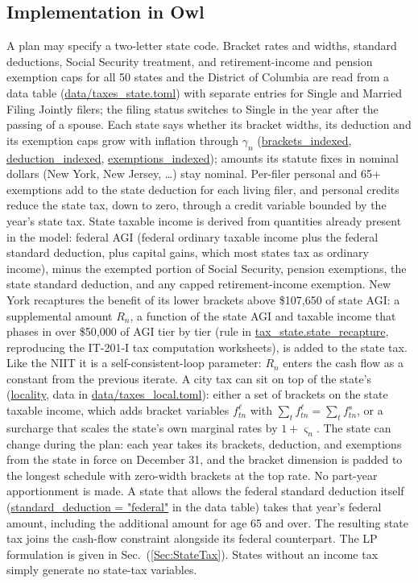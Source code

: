 \documentclass[fleqn,12pt]{report}
\newcommand{\code}[1]{\url{#1}}
\begin{document}
\subsection*{Implementation in Owl}
A plan may specify a two-letter state code.
Bracket rates and widths, standard deductions, Social Security treatment, and
retirement-income and pension exemption caps for all 50 states and the District
of Columbia are read from a data table (\code{data/taxes_state.toml}) with
separate entries for Single and Married Filing Jointly filers; the filing
status switches to Single in the year after the passing of a spouse. Each state says whether its
bracket widths, its deduction and its exemption caps grow with inflation through
$\gamma_n$ (\code{brackets_indexed}, \code{deduction_indexed},
\code{exemptions_indexed}); amounts its statute fixes in nominal dollars (New
York, New Jersey, \ldots) stay nominal. Per-filer personal and 65+ exemptions
add to the state deduction for each living filer, and personal credits reduce
the state tax, down to zero, through a credit variable bounded by the year's
state tax.
State taxable income is derived from quantities already present in the model:
federal AGI (federal ordinary taxable income plus the federal standard
deduction, plus capital gains, which most states tax as ordinary income), minus
the exempted portion of Social Security, pension exemptions, the state
standard deduction, and any capped retirement-income exemption.
New York recaptures the benefit of its lower brackets above \$107{,}650 of state
AGI: a supplemental amount $R_n$, a function of the state AGI and taxable income
that phases in over \$50{,}000 of AGI tier by tier (rule in \code{tax\_state.state\_recapture},
reproducing the IT-201-I tax computation worksheets), is added to the state tax.
Like the NIIT it is a self-consistent-loop parameter: $R_n$ enters the cash flow as
a constant from the previous iterate.
A city tax can sit on top of the state's (\code{locality}, data in
\code{data/taxes\_local.toml}): either a set of brackets on the state taxable
income, which adds bracket variables $f^{\ell}_{tn}$ with
$\sum_t f^{\ell}_{tn} = \sum_t f^{s}_{tn}$, or a surcharge that scales the
state's own marginal rates by $1+\varsigma_n$.
The state can change during the plan: each year takes its brackets, deduction,
and exemptions from the state in force on December 31, and the bracket
dimension is padded to the longest schedule with zero-width brackets at the top
rate. No part-year apportionment is made.
A state that allows the federal standard deduction itself
(\code{standard\_deduction = "federal"} in the data table) takes that year's
federal amount, including the additional amount for age 65 and over.
The resulting state tax joins the cash-flow constraint alongside its federal
counterpart.
The LP formulation is given in Sec.~(\ref{Sec:StateTax}).
States without an income tax simply generate no state-tax variables.
\end{document}
